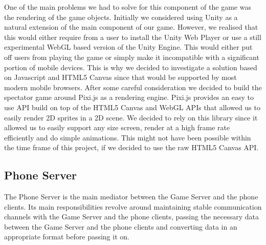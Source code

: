 \documentclass[a4paper,11pt]{article}
\begin{document}
One of the main problems we had to solve for this component of the game was the rendering of the game objects. Initially we considered using Unity as a natural extension of the main component of our game. However, we realised that this would either require from a user to install the Unity Web Player or use a still experimental WebGL based version of the Unity Engine. This would either put off users from playing the game or simply make it incompatible with a significant portion of mobile devices. This is why we decided to investigate a solution based on Javascript and HTML5 Canvas\cite{html5_canvas} since that would be supported by most modern mobile browsers. After some careful consideration we decided to build the spectator game around Pixi.js\cite{pixi_js} as a rendering engine. Pixi.js provides an easy to use API build on top of the HTML5 Canvas and WebGL APIs that allowed us to easily render 2D sprites in a 2D scene. We decided to rely on this library since it allowed us to easily support any size screen, render at a high frame rate efficiently and do simple animations. This might not have been possible within the time frame of this project, if we decided to use the raw HTML5 Canvas API.

\subsection{Phone Server}
The Phone Server is the main mediator between the Game Server and the phone clients. Its main responsibilities revolve around maintaining stable communication channels with the Game Server and the phone clients, passing the necessary data between the Game Server and the phone clients and converting data in an appropriate format before passing it on.
\end{document}
